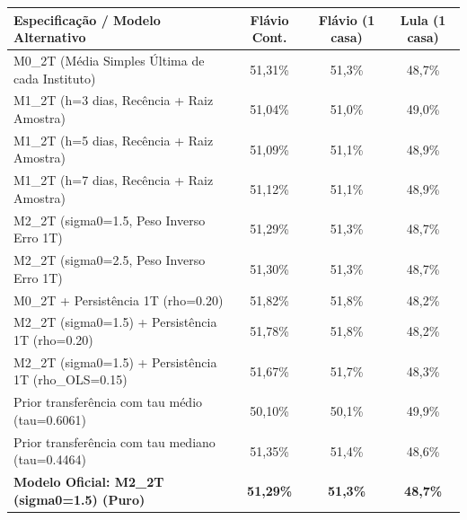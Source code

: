 \begin{tabular}{lccc}
\toprule
\textbf{Especificação / Modelo Alternativo} & \textbf{Flávio Cont.} & \textbf{Flávio (1 casa)} & \textbf{Lula (1 casa)} \\
\midrule
M0\_2T (Média Simples Última de cada Instituto) & 51,31\% & 51,3\% & 48,7\% \\
M1\_2T (h=3 dias, Recência + Raiz Amostra) & 51,04\% & 51,0\% & 49,0\% \\
M1\_2T (h=5 dias, Recência + Raiz Amostra) & 51,09\% & 51,1\% & 48,9\% \\
M1\_2T (h=7 dias, Recência + Raiz Amostra) & 51,12\% & 51,1\% & 48,9\% \\
M2\_2T (sigma0=1.5, Peso Inverso Erro 1T) & 51,29\% & 51,3\% & 48,7\% \\
M2\_2T (sigma0=2.5, Peso Inverso Erro 1T) & 51,30\% & 51,3\% & 48,7\% \\
M0\_2T + Persistência 1T (rho=0.20) & 51,82\% & 51,8\% & 48,2\% \\
M2\_2T (sigma0=1.5) + Persistência 1T (rho=0.20) & 51,78\% & 51,8\% & 48,2\% \\
M2\_2T (sigma0=1.5) + Persistência 1T (rho\_OLS=0.15) & 51,67\% & 51,7\% & 48,3\% \\
Prior transferência com tau médio (tau=0.6061) & 50,10\% & 50,1\% & 49,9\% \\
Prior transferência com tau mediano (tau=0.4464) & 51,35\% & 51,4\% & 48,6\% \\
\textbf{\textbf{Modelo Oficial: M2\_2T (sigma0=1.5) (Puro)}} & \textbf{51,29\%} & \textbf{51,3\%} & \textbf{48,7\%} \\
\bottomrule
\end{tabular}
